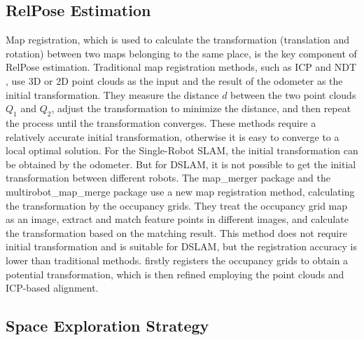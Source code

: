 \subsection{RelPose Estimation}
Map registration, which is used to calculate the transformation (translation and rotation) between two maps belonging to the same place, is the key component of RelPose estimation.
Traditional map registration methods, such as ICP \cite{Besl1992A} and NDT \cite{ndt}, use 3D or 2D point clouds as the input and the result of the odometer as the initial transformation.
They measure the distance $d$ between the two point clouds $Q_1$ and $Q_2$, adjust the transformation to minimize the distance, and then repeat the process until the transformation converges.
These methods require a relatively accurate initial transformation, otherwise it is easy to converge to a local optimal solution.
For the Single-Robot SLAM, the initial transformation can be obtained by the odometer.
But for DSLAM, it is not possible to get the initial transformation between different robots.
The map\_merger package \cite{Andre2015Coordinated} and the multirobot\_map\_merge package \cite{Horner2016} use a new map registration method, calculating the transformation by the occupancy grids.
They treat the occupancy grid map as an image, extract and match feature points in different images, and calculate the transformation based on the matching result.
This method does not require initial transformation and is suitable for DSLAM, but the registration accuracy is lower than traditional methods.
\cite{blanco2013robust} firstly registers the occupancy grids to obtain a potential transformation, which is then refined employing the point clouds and ICP-based alignment.

\subsection{Space Exploration Strategy}
